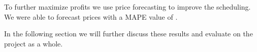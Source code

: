 To further maximize profits we use price forecasting to improve the scheduling. We were able to forecast prices with a MAPE value of .

In the following section we will further discuss these results and evaluate on the project as a whole.




